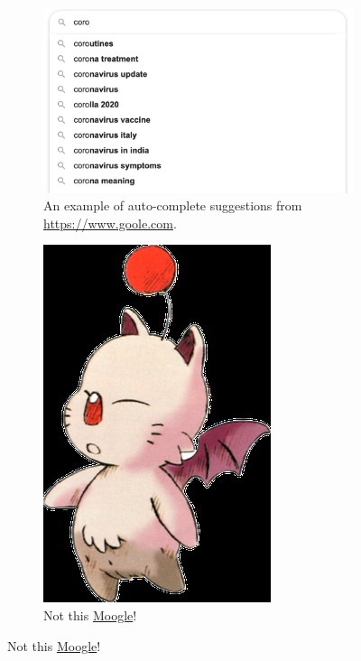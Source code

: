 \documentclass[addpoints]{exam}
\begin{document}
\begin{figure}
  \centering
  \begin{subfigure}{.7\textwidth}
    \includegraphics[width=\textwidth]{autocomplete}
    \caption{An example of auto-complete suggestions from \url{https://www.goole.com}.}
    \label{fig:autocomplete}
  \end{subfigure}
  \begin{subfigure}{.2\textwidth}
    \includegraphics[width=\textwidth]{moogle}
    \caption{Not this \href{https://finalfantasy.fandom.com/wiki/Final_Fantasy_Wiki}{Moogle}!}
    \label{fig:moogle}
  \end{subfigure}
\end{figure}
\end{document}
